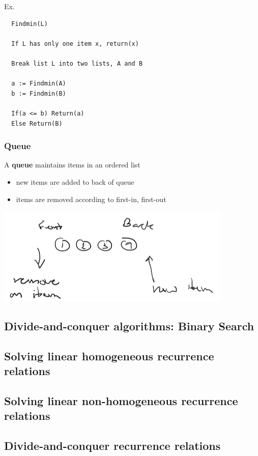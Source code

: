 Ex.
\begin{lstlisting}
  Findmin(L)

  If L has only one item x, return(x)

  Break list L into two lists, A and B

  a := Findmin(A)
  b := Findmin(B)

  If(a <= b) Return(a)
  Else Return(B)
\end{lstlisting}

\subsubsection*{Queue}
A \textbf{queue} maintains items in an ordered list
\begin{itemize}
  \item new items are added to back of queue
  \item items are removed according to first-in, first-out
\end{itemize}
\begin{center}
  \includegraphics[width=.6\linewidth]{resources/queue.png}
\end{center}

\subsection{Divide-and-conquer algorithms: Binary Search}


\subsection{Solving linear homogeneous recurrence relations}


\subsection{Solving linear non-homogeneous recurrence relations}


\subsection{Divide-and-conquer recurrence relations}
